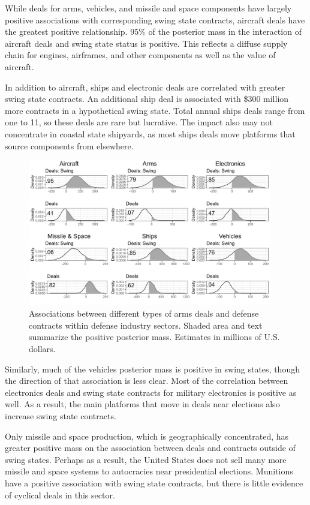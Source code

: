 \documentclass[12pt]{article}
\begin{document}
While deals for arms, vehicles, and missile and space components have largely positive associations with corresponding swing state contracts, aircraft deals have the greatest positive relationship. 
95\% of the posterior mass in the interaction of aircraft deals and swing state status is positive.
This reflects a diffuse supply chain for engines, airframes, and other components as well as the value of aircraft.


In addition to aircraft, ships and electronic deals are correlated with greater swing state contracts. 
An additional ship deal is associated with \$300 million more contracts in a hypothetical swing state. 
Total annual ships deals range from one to 11, so these deals are rare but lucrative. 
The impact also may not concentrate in coastal state shipyards, as most ships deals move platforms that source components from elsewhere. 


\begin{figure}[htpb]
	\centering
		\includegraphics[width=0.95\textwidth]{../figures/me-deals-sector.png}
	\caption{Associations between different types of arms deals and defense contracts within defense industry sectors. Shaded area and text summarize the positive posterior mass. Estimates in millions of U.S. dollars.}
	\label{fig:me-deals-sector}
\end{figure}


Similarly, much of the vehicles posterior mass is positive in swing states, though the direction of that association is less clear.
Most of the correlation between electronics deals and swing state contracts for military electronics is positive as well.
As a result, the main platforms that move in deals near elections also increase swing state contracts. 


Only missile and space production, which is geographically concentrated, has greater positive mass on the association between deals and contracts outside of swing states. 
Perhaps as a result, the United States does not sell many more missile and space systems to autocracies near presidential elections. 
Munitions have a positive association with swing state contracts, but there is little evidence of cyclical deals in this sector. 
\end{document}
